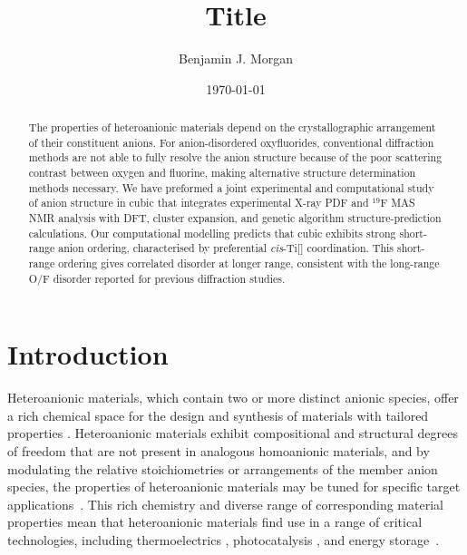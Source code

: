 \documentclass[aps,prmaterials,twocolumn,superscriptaddress,reprint,citeautoscript]{revtex4-2}
\newcommand{\cis}{\emph{cis}}
\begin{document}
\title{Title}

\author{Benjamin J. Morgan }

\date{\today}

\begin{abstract}
  The properties of heteroanionic materials depend on the crystallographic arrangement of their constituent anions. 
  For anion-disordered oxyfluorides, conventional diffraction methods are not able to fully resolve the anion structure because of the poor scattering contrast between oxygen and fluorine, making alternative structure determination methods necessary. 
  We have preformed a joint experimental and computational study of anion structure in cubic  that integrates experimental X-ray PDF and $^{19}$F MAS NMR analysis with DFT, cluster expansion, and genetic algorithm structure-prediction calculations. 
  Our computational modelling predicts that cubic  exhibits strong short-range anion ordering, characterised by preferential \cis-Ti[] coordination. 
  This short-range ordering gives correlated disorder at longer range, consistent with the long-range O/F disorder reported for previous diffraction studies.
\end{abstract}
\maketitle

\section{Introduction}
Heteroanionic materials, which contain two or more distinct anionic species, offer a rich chemical space for the design and synthesis of materials with tailored properties \cite{HaradaEtAl_AdvMater2019,KageyamaEtAl_NatCommun2018,CharlesEtAl_ChemMater2018}.
Heteroanionic materials exhibit compositional and structural degrees of freedom that are not present in analogous homoanionic materials, and by modulating the relative stoichiometries or arrangements of the member anion species, the properties of heteroanionic materials may be tuned for specific target applications~\cite{WagnerEtAl_PhysRevB2019}.
This rich chemistry and diverse range of corresponding material properties mean that heteroanionic materials find use in a range of critical technologies, including thermoelectrics \cite{ZhaoEtAl_ApplPhysLett2010}, photocatalysis \cite{GouEtAl_ChemMater2020}, and energy storage~\cite{Morgan_ChemMater2021,McCollEtAl_NatureCommun2022,ColesEtAl_JMaterChemA2023}. 
\end{document}
